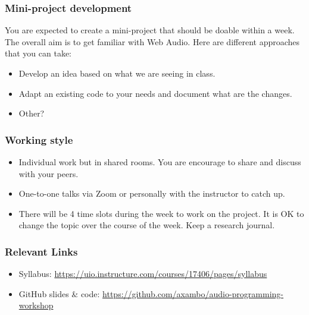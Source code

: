\documentclass[screen, aspectratio=43]{beamer}
\begin{document}
%
\begin{frame}
\frametitle{Mini-project development}
You are expected to create a mini-project that should be doable within a week. The overall aim is to get familiar with Web Audio. Here are different approaches that you can take:
\begin{itemize}
\item Develop an idea based on what we are seeing in class.
\item Adapt an existing code to your needs and document what are the changes.
\item Other?
\end{itemize}
\end{frame}
%
\begin{frame}
\frametitle{Working style}
\begin{itemize}
\item Individual work but in shared rooms. You are encourage to share and discuss with your peers.
\item One-to-one talks via Zoom or personally with the instructor to catch up.
\item There will be 4 time slots during the week to work on the project. It is OK to change the topic over the course of the week. Keep a research journal.
\end{itemize}
\end{frame}
%
\begin{frame}
\frametitle{Relevant Links}
\begin{itemize}
\item Syllabus: \url{https://uio.instructure.com/courses/17406/pages/syllabus}
\item GitHub slides \& code: \url{https://github.com/axambo/audio-programming-workshop}
\end{itemize}
\end{frame}
%
%
\end{document}
